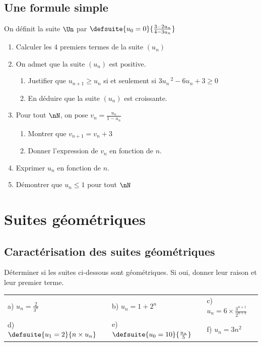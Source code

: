 \documentclass[oneside,12pt]{book}          %
\begin{document}
\subsection{Une formule simple}
On définit la suite $\Un$ par $\defsuite{u_0=0}{\frac{3-2u_n}{4-3u_n}}$
\begin{enumerate}
	\item Calculer les 4 premiers termes de la suite $(u_n)$
	\item On admet que la suite $(u_n)$ est positive.
	\begin{enumerate}
		\item Justifier que $u_{n+1}\geq u_n$ si et seulement si $3u_n\,^2-6u_n+3\geq0$
		\item En déduire que la suite $(u_n)$ est croissante.
	\end{enumerate}
	\item Pour tout $\nN$, on pose $v_n=\frac{u_n}{1-u_n}$
	\begin{enumerate}
		\item Montrer que $v_{n+1}=v_n+3$
		\item Donner l'expression de $v_n$ en fonction de $n$.
	\end{enumerate}
	\item Exprimer $u_n$ en fonction de $n$.
	\item Démontrer que $u_n\leq1$ pour tout $\nN$
\end{enumerate}



\section{Suites géométriques}

\subsection{Caractérisation des suites géométriques}
Déterminer si les suites ci-dessous sont géométriques. Si oui, donner leur raison et leur premier terme.\\
\begin{tabular}{p{} p{} p{}}
	a) $u_n=\frac{2}{3^{n}}$ & b) $u_n=1+2^{n}$ & c) $u_n=6\times\frac{3^{n+1}}{2^{n+2}}$ \\
	d) $ \defsuite{u_{1}=2}{n\times u_n}$ & e) $\defsuite{u_{0}=10}{\frac{u_n}{5}}$ & f) $u_n=3n^{2}$
\end{tabular}
\end{document}
